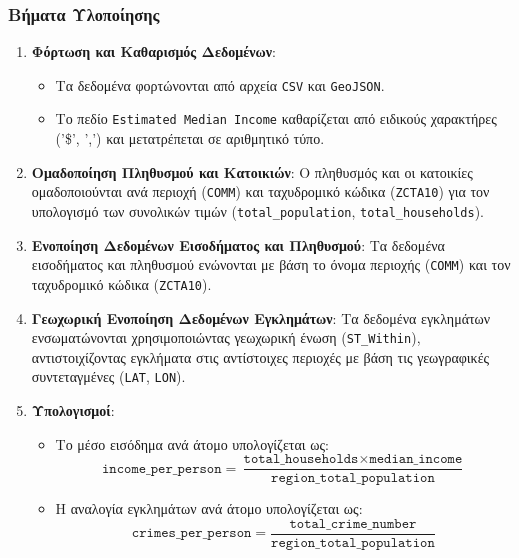 \documentclass{article}
\begin{document}
\subsubsection*{Βήματα Υλοποίησης}
\begin{enumerate}
    \item \textbf{Φόρτωση και Καθαρισμός Δεδομένων}:
    \begin{itemize}
        \item Τα δεδομένα φορτώνονται από αρχεία \texttt{CSV} και \texttt{GeoJSON}.
        \item Το πεδίο \texttt{Estimated Median Income} καθαρίζεται από ειδικούς χαρακτήρες ('\$', ',') και μετατρέπεται σε αριθμητικό τύπο.
    \end{itemize}
    
    \item \textbf{Ομαδοποίηση Πληθυσμού και Κατοικιών}:
    Ο πληθυσμός και οι κατοικίες ομαδοποιούνται ανά περιοχή (\texttt{COMM}) και ταχυδρομικό κώδικα (\texttt{ZCTA10}) για τον υπολογισμό των συνολικών τιμών (\texttt{total\_population}, \texttt{total\_households}).

    \item \textbf{Ενοποίηση Δεδομένων Εισοδήματος και Πληθυσμού}:
    Τα δεδομένα εισοδήματος και πληθυσμού ενώνονται με βάση το όνομα περιοχής (\texttt{COMM}) και τον ταχυδρομικό κώδικα (\texttt{ZCTA10}).

    \item \textbf{Γεωχωρική Ενοποίηση Δεδομένων Εγκλημάτων}:
    Τα δεδομένα εγκλημάτων ενσωματώνονται χρησιμοποιώντας γεωχωρική ένωση (\texttt{ST\_Within}), αντιστοιχίζοντας εγκλήματα στις αντίστοιχες περιοχές με βάση τις γεωγραφικές συντεταγμένες (\texttt{LAT}, \texttt{LON}).

    \item \textbf{Υπολογισμοί}:
    \begin{itemize}
        \item Το μέσο εισόδημα ανά άτομο υπολογίζεται ως:
        \[
        \texttt{income\_per\_person} = \frac{\texttt{total\_households} \times \texttt{median\_income}}{\texttt{region\_total\_population}}
        \]
        \item Η αναλογία εγκλημάτων ανά άτομο υπολογίζεται ως:
        \[
        \texttt{crimes\_per\_person} = \frac{\texttt{total\_crime\_number}}{\texttt{region\_total\_population}}
        \]
    \end{itemize}


\end{enumerate}
\end{document}
